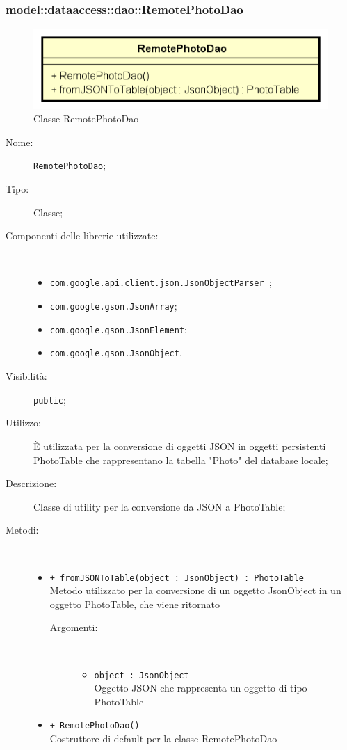 \documentclass[../DefinizioneDiProdotto.tex]{subfiles}
\begin{document}
\subsubsection{model::dataaccess::dao::RemotePhotoDao}

    \begin{figure}[H]
        \centering
        \includegraphics{img/RemotePhotoDao.png}
        \caption{Classe RemotePhotoDao}\label{fig:model::dataaccess::dao::RemotePhotoDao} 
    \end{figure}
    \begin{description}
\item[Nome:] \texttt{RemotePhotoDao};
\item[Tipo:] Classe;
\item[Componenti delle librerie utilizzate:] \
\begin{itemize}
\item \texttt{com.google.api.client.json.JsonObjectParser
};

\item \texttt{com.google.gson.JsonArray};

\item \texttt{com.google.gson.JsonElement};

\item \texttt{com.google.gson.JsonObject}.

\end{itemize}
\item[Visibilità:] \texttt{public};
\item[Utilizzo:] È utilizzata per la conversione di oggetti JSON in oggetti persistenti PhotoTable che rappresentano la tabella "Photo" del database locale;
\item[Descrizione:] Classe di utility per la conversione da JSON a PhotoTable;
\item[Metodi:] \
\begin{itemize}
\item \texttt{+ fromJSONToTable(object : JsonObject) : PhotoTable}\\
Metodo utilizzato per la conversione di un oggetto JsonObject in un oggetto PhotoTable, che viene ritornato
 \begin{description}
\item[Argomenti:] \
\begin{itemize}
\item \texttt{object : JsonObject}\\
Oggetto JSON che rappresenta un oggetto di tipo PhotoTable\end{itemize}
\end{description}
\item \texttt{+ RemotePhotoDao()}\\
Costruttore di default per la classe RemotePhotoDao
 \end{itemize}
\end{description}
\end{document}
